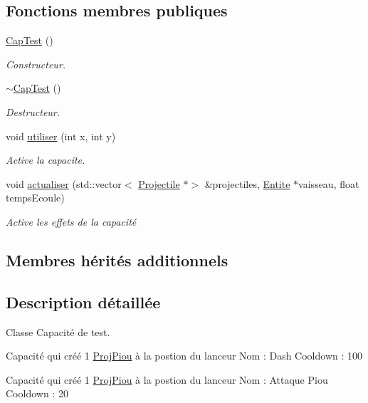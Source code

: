 \subsection*{Fonctions membres publiques}
\begin{DoxyCompactItemize}
\item 
\hyperlink{class_cap_test_a5f6d4b172a6a40f974b3f7414e3f06e5}{Cap\+Test} ()
\begin{DoxyCompactList}\small\item\em Constructeur. \end{DoxyCompactList}\item 
\hyperlink{class_cap_test_a92687aa212347d1738e7736cb107d03b}{$\sim$\+Cap\+Test} ()
\begin{DoxyCompactList}\small\item\em Destructeur. \end{DoxyCompactList}\item 
void \hyperlink{class_cap_test_a9c85a17dec6cf78f1438b08b175f650d}{utiliser} (int x, int y)
\begin{DoxyCompactList}\small\item\em Active la capacite. \end{DoxyCompactList}\item 
void \hyperlink{class_cap_test_af8e8fad88e1e4f0037eee576331d3238}{actualiser} (std\+::vector$<$ \hyperlink{class_projectile}{Projectile} $\ast$$>$ \&projectiles, \hyperlink{class_entite}{Entite} $\ast$vaisseau, float temps\+Ecoule)
\begin{DoxyCompactList}\small\item\em Active les effets de la capacité \end{DoxyCompactList}\end{DoxyCompactItemize}
\subsection*{Membres hérités additionnels}


\subsection{Description détaillée}
Classe Capacité de test. 

Capacité qui créé 1 \hyperlink{class_proj_piou}{Proj\+Piou} à la postion du lanceur Nom \+: Dash Cooldown \+: 100

Capacité qui créé 1 \hyperlink{class_proj_piou}{Proj\+Piou} à la postion du lanceur Nom \+: Attaque Piou Cooldown \+: 20

